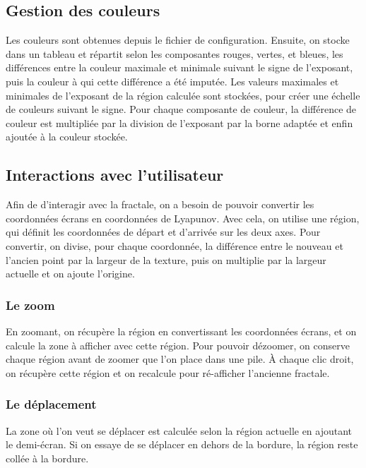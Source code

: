 \documentclass{article}
\begin{document}
	\subsection{Gestion des couleurs}

	Les couleurs sont obtenues depuis le fichier de configuration.
	Ensuite, on stocke dans un tableau et répartit selon les composantes rouges, vertes, et bleues, les différences entre la couleur maximale et minimale suivant le signe de l'exposant, puis la couleur à qui cette différence a été imputée.
	Les valeurs maximales et minimales de l'exposant de la région calculée sont stockées, pour créer une échelle de couleurs suivant le signe.
	Pour chaque composante de couleur, la différence de couleur est multipliée par la division de l'exposant par la borne adaptée et enfin ajoutée à la couleur stockée.

	\subsection{Interactions avec l'utilisateur}

	Afin de d'interagir avec la fractale, on a besoin de pouvoir convertir les coordonnées écrans en coordonnées de Lyapunov.
	Avec cela, on utilise une région, qui définit les coordonnées de départ et d'arrivée sur les deux axes.
	Pour convertir, on divise, pour chaque coordonnée, la différence entre le nouveau et l'ancien point par la largeur de la texture, puis on multiplie par la largeur actuelle et on ajoute l'origine.

	\subsubsection{Le zoom}

	En zoomant, on récupère la région en convertissant les coordonnées écrans, et on calcule la zone à afficher avec cette région.
	Pour pouvoir dézoomer, on conserve chaque région avant de zoomer que l'on place dans une pile.
	À chaque clic droit, on récupère cette région et on recalcule pour ré-afficher l'ancienne fractale.

	\subsubsection{Le déplacement}

	La zone où l'on veut se déplacer est calculée selon la région actuelle en ajoutant le demi-écran.
	Si on essaye de se déplacer en dehors de la bordure, la région reste collée à la bordure.
\end{document}
